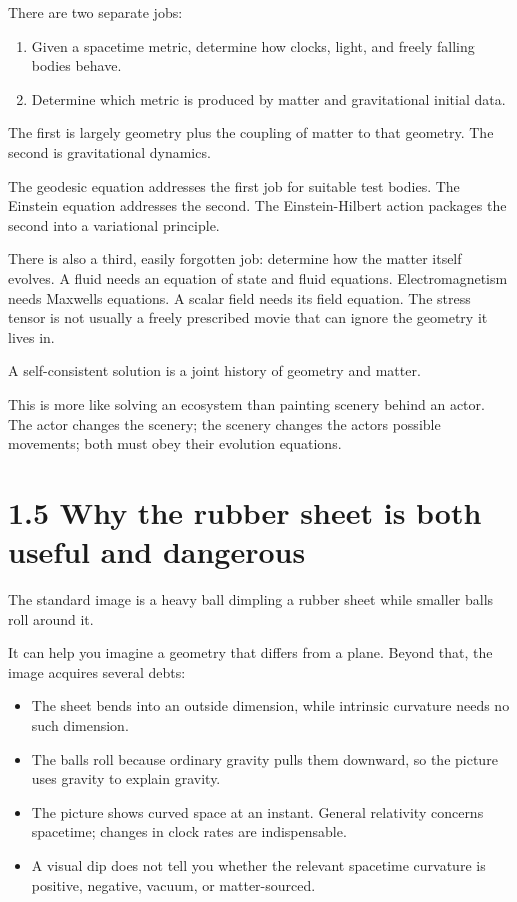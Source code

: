 \documentclass[
  11pt,
  letterpaper,
  oneside,
  openany]{scrbook}
\providecommand{\tightlist}{%
  \setlength{\itemsep}{0pt}\setlength{\parskip}{0pt}}
\begin{document}
There are two separate jobs:

\begin{enumerate}
\def\labelenumi{\arabic{enumi}.}
\tightlist
\item
  Given a spacetime metric, determine how clocks, light, and freely
  falling bodies behave.
\item
  Determine which metric is produced by matter and gravitational initial
  data.
\end{enumerate}

The first is largely geometry plus the coupling of matter to that
geometry. The second is gravitational dynamics.

The geodesic equation addresses the first job for suitable test bodies.
The Einstein equation addresses the second. The Einstein-Hilbert action
packages the second into a variational principle.

There is also a third, easily forgotten job: determine how the matter
itself evolves. A fluid needs an equation of state and fluid equations.
Electromagnetism needs Maxwell\textquotesingle s equations. A scalar
field needs its field equation. The stress tensor is not usually a
freely prescribed movie that can ignore the geometry it lives in.

A self-consistent solution is a joint history of geometry and matter.

This is more like solving an ecosystem than painting scenery behind an
actor. The actor changes the scenery; the scenery changes the
actor\textquotesingle s possible movements; both must obey their
evolution equations.

\hypertarget{why-the-rubber-sheet-is-both-useful-and-dangerous}{%
\section{1.5 Why the rubber sheet is both useful and
dangerous}\label{why-the-rubber-sheet-is-both-useful-and-dangerous}}

The standard image is a heavy ball dimpling a rubber sheet while smaller
balls roll around it.

It can help you imagine a geometry that differs from a plane. Beyond
that, the image acquires several debts:

\begin{itemize}
\tightlist
\item
  The sheet bends into an outside dimension, while intrinsic curvature
  needs no such dimension.
\item
  The balls roll because ordinary gravity pulls them downward, so the
  picture uses gravity to explain gravity.
\item
  The picture shows curved space at an instant. General relativity
  concerns spacetime; changes in clock rates are indispensable.
\item
  A visual dip does not tell you whether the relevant spacetime
  curvature is positive, negative, vacuum, or matter-sourced.
\end{itemize}
\end{document}
